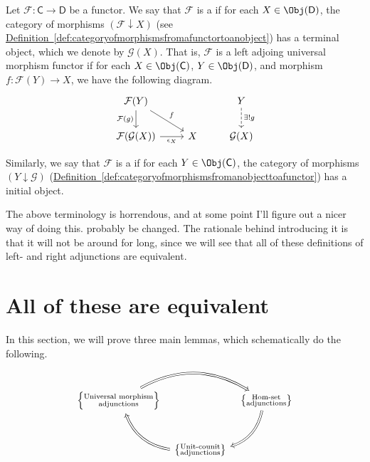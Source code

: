 \documentclass[notes.tex]{subfiles}
\begin{document}
\begin{definition}
  \label{def:universal_morphism_adjunction}
  Let $\mathcal{F}\colon \mathsf{C} \to \mathsf{D}$ be a functor. We say that $\mathcal{F}$ is a  if for each $X \in \Obj(\mathsf{D})$, the category of morphisms $(\mathcal{F} \downarrow X)$ (see \hyperref[def:categoryofmorphismsfromafunctortoanobject]{Definition~\ref*{def:categoryofmorphismsfromafunctortoanobject}}) has a terminal object, which we denote by $\mathcal{G}(X)$. That is, $\mathcal{F}$ is a left adjoing universal morphism functor if for each $X \in \Obj(\mathsf{C})$, $Y \in \Obj(\mathsf{D})$, and morphism $f\colon \mathcal{F}(Y) \to X$, we have the following diagram.
  \begin{equation*}
    \begin{tikzcd}
      \mathcal{F}(Y)
      \arrow[rd, "f"]
      \arrow[d, swap, "\mathcal{F}(g)"]
      & & Y
      \arrow[d, dashed, "\exists!g"]
      \\
      \mathcal{F}(\mathcal{G}(X))
      \arrow[r, swap, "\epsilon_{X}"]
      & X
      & \mathcal{G}(X)
    \end{tikzcd}
  \end{equation*}

  Similarly, we say that $\mathcal{F}$ is a  if for each $Y \in \Obj(\mathsf{C})$, the category of morphisms $(Y \downarrow \mathcal{G})$ (\hyperref[def:categoryofmorphismsfromanobjecttoafunctor]{Definition~\ref*{def:categoryofmorphismsfromanobjecttoafunctor}}) has a initial object.
\end{definition}

The above terminology is horrendous, and at some point I'll figure out a nicer way of doing this. probably be changed. The rationale behind introducing it is that it will not be around for long, since we will see that all of these definitions of left- and right adjunctions are equivalent.

\section{All of these are equivalent}
\label{sec:unit_counit_adjunctions_are_hom_set_adjunctions}

In this section, we will prove three main lemmas, which schematically do the following.
\begin{equation*}
  \begin{tikzcd}[row sep=large, column sep=tiny]
    \left\{\substack{\text{Universal morphism}\\\text{adjunctions}}\right\}
    \arrow[rr, bend left, Rightarrow]
    && \left\{\substack{\text{Hom-set}\\\text{adjunctions}}\right\}
    \arrow[dl, bend left, Rightarrow]
    \\
    & \left\{ \substack{\text{Unit-counit}\\\text{adjunctions}} \right\}
    \arrow[ul, bend left, Rightarrow]
  \end{tikzcd}
\end{equation*}
\end{document}

